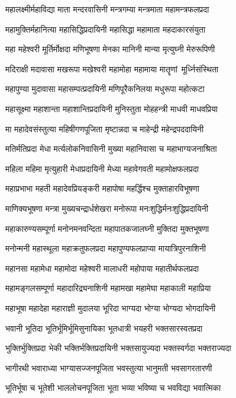 \twolineshloka
{महालक्ष्मीर्महाविद्या माता मन्दरवासिनी}
{मन्त्रगम्या मन्त्रमाता महामन्त्रफलप्रदा}%

\twolineshloka
{महामुक्तिर्महानित्या महासिद्धिप्रदायिनी}
{महासिद्धा महामाता महदाकारसंयुता}%

\twolineshloka
{महा महेश्वरी मूर्तिर्मोक्षदा मणिभूषणा}
{मेनका मानिनी मान्या मृत्युघ्नी मेरुरूपिणी}%

\twolineshloka
{मदिराक्षी मदावासा मखरूपा मखेश्वरी}
{महामोहा महामाया मातॄणां~मूर्ध्निसंस्थिता}%

\twolineshloka
{महापुण्या मुदावासा महासम्पत्प्रदायिनी}
{मणिपूरैकनिलया मधुरूपा महोत्कटा}%

\twolineshloka
{महासूक्ष्मा महाशान्ता महाशान्तिप्रदायिनी}
{मुनिस्तुता मोहहन्त्री माधवी माधवप्रिया}%

\twolineshloka
{मा महादेवसंस्तुत्या महिषीगणपूजिता}
{मृष्टान्नदा च माहेन्द्री महेन्द्रपददायिनी}%

\twolineshloka
{मतिर्मतिप्रदा मेधा मर्त्यलोकनिवासिनी}
{मुख्या महानिवासा च महाभाग्यजनाश्रिता}%

\twolineshloka
{महिला महिमा मृत्युहारी मेधाप्रदायिनी}
{मेध्या महावेगवती महामोक्षफलप्रदा}%

\twolineshloka
{महाप्रभाभा महती महादेवप्रियङ्करी}
{महापोषा महर्द्धिश्च मुक्ताहारविभूषणा}%

\twolineshloka
{माणिक्यभूषणा मन्त्रा मुख्यचन्द्रार्धशेखरा}
{मनोरूपा मनःशुद्धिर्मनःशुद्धिप्रदायिनी}%

\twolineshloka
{महाकारुण्यसम्पूर्णा मनोनमनवन्दिता}
{महापातकजालघ्नी मुक्तिदा मुक्तभूषणा}%

\twolineshloka
{मनोन्मनी महास्थूला महाक्रतुफलप्रदा}
{महापुण्यफलप्राप्या मायात्रिपुरनाशिनी}%

\twolineshloka
{महानसा महामेधा महामोदा महेश्वरी}
{मालाधरी महोपाया महातीर्थफलप्रदा}%

\twolineshloka
{महामङ्गलसम्पूर्णा महादारिद्र्यनाशिनी}
{महामखा महामेघा महाकाली महाप्रिया}%

\twolineshloka
{महाभूषा महादेहा महाराज्ञी मुदालया}
{भूरिदा भाग्यदा भोग्या भोग्यदा भोगदायिनी}%

\twolineshloka
{भवानी भूतिदा भूतिर्भूमिर्भूमिसुनायिका}
{भूतधात्री भयहरी भक्तसारस्वतप्रदा}%

\twolineshloka
{भुक्तिर्भुक्तिप्रदा भेकी भक्तिर्भक्तिप्रदायिनी}
{भक्तसायुज्यदा भक्तस्वर्गदा भक्तराज्यदा}%

\twolineshloka
{भागीरथी भवाराध्या भाग्यासज्जनपूजिता}
{भवस्तुत्या भानुमती भवसागरतारणी}%

\twolineshloka
{भूतिर्भूषा च भूतेशी भाललोचनपूजिता}
{भूता भव्या भविष्या च भवविद्या भवात्मिका}%

